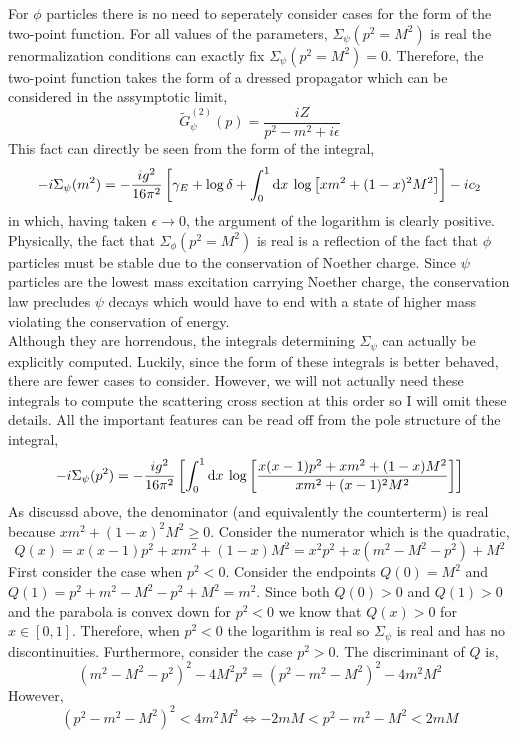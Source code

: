 \documentclass{article}
\begin{document}
For $\phi$ particles there is no need to seperately consider cases for the form of the two-point function. For all values of the parameters, $\Sigma_\psi(p^2 = M^2)$ is real the renormalization conditions can exactly fix $\Sigma_\psi(p^2 = M^2) = 0$. Therefore, the two-point function takes the form of a dressed propagator which can be considered in the assymptotic limit,
\[ \tilde{G}_\psi^{(2)}(p) = \frac{i Z}{p^2 - m^2 + i \epsilon} \]
This fact can directly be seen from the form of the integral, 
\[ - i \Sigma_\psi(m^2) = -\frac{ig^2}{16 \pi^2} \left[ \gamma_E + \log{\delta} + \int_{0}^{1} \mathrm{d}x \: \log{\left[ x m^2 + (1 - x)^2 M^2 \right]} \right] - i c_2 \]
in which, having taken $\epsilon \to 0$, the argument of the logarithm is clearly positive. Physically, the fact that $\Sigma_\phi(p^2 = M^2)$ is real is a reflection of the fact that $\phi$ particles must be stable due to the conservation of Noether charge. Since $\psi$ particles are the lowest mass excitation carrying Noether charge, the conservation law precludes $\psi$ decays which would have to end with a state of higher mass violating the conservation of energy. \bigskip\\
Although they are horrendous, the integrals determining $\Sigma_\psi$ can actually be explicitly computed. Luckily, since the form of these integrals is better behaved, there are fewer cases to consider. However, we will not actually need these integrals to compute the scattering cross section at this order so I will omit these details. All the important features can be read off from the pole structure of the integral,
\[ - i \Sigma_\psi(p^2) = - \frac{ig^2}{16 \pi^2} \left[ \int_{0}^{1} \mathrm{d}x \: \log{\left[\frac{ x(x - 1) p^2 + x m^2 + (1 - x) M^2}{x m^2 + (x - 1)^2 M^2} \right]} \right] \]
As discussd above, the denominator (and equivalently the counterterm) is real because $x m^2 + (1 - x)^2 M^2 \ge 0$. Consider the numerator which is the quadratic,
\[Q(x) = x(x - 1) p^2 + x m^2 + (1-x)M^2 = x^2 p^2 + x (m^2 - M^2 - p^2) + M^2 \]
First consider the case when $p^2 < 0$. Consider the endpoints $Q(0) = M^2$ and $Q(1) = p^2 + m^2 - M^2 - p^2 + M^2 = m^2$. Since both $Q(0) > 0$ and $Q(1) > 0$ and the parabola is convex down for $p^2 < 0$ we know that $Q(x) > 0$ for $x \in [0,1]$. Therefore, when $p^2 < 0$ the logarithm is real so $\Sigma_\psi$ is real and has no discontinuities. Furthermore, consider the case $p^2 > 0$. The discriminant of $Q$ is,
\[ (m^2 - M^2 - p^2)^2 - 4 M^2 p^2 = (p^2 - m^2 - M^2)^2 - 4 m^2 M^2 \]
However, 
\[ (p^2 - m^2 - M^2)^2 < 4 m^2 M^2 \iff - 2 m M < p^2 - m^2 - M^2 < 2 m M\]
\end{document}
